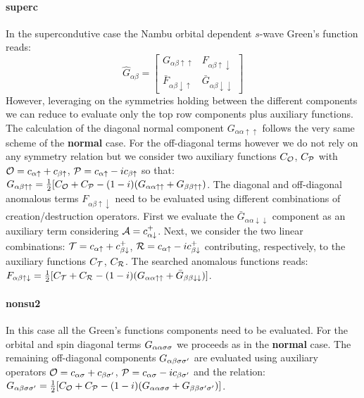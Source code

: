 \documentclass[final,3p,10pt]{elsarticle}
\def\a{\alpha}       \def\b{\beta}   \def\g{\gamma}   \def\d{\delta}
\def\PP{{\cal P}}\def\EE{{\cal E}}\def\MM{{\cal M}} \def\VV{{\cal V}}
\def\TT{{\cal T}}\def\NN{{\cal N}}\def\BB{{\cal B}} \def\II{{\cal I}}
\def\RR{{\cal R}}\def\LL{{\cal L}}\def\JJ{{\cal J}} \def\OO{{\cal O}}
\def\AA{{\cal A}}
\def\up{\uparrow} \def\down{\downarrow} \def\dw{\downarrow}
\begin{document}
\paragraph{{\bf superc}}
In the supercondutive case the Nambu orbital
dependent $s$-wave Green's function reads:
\begin{equation}
  \label{GFnambu}
  \hat{G}_{\a\b} =
  \begin{bmatrix}
    G_{\a\b\up\up} & F_{\a\b\up\dw} \\
    \bar{F}_{\a\b\dw\up} & \bar{G}_{\a\b\dw\dw}
  \end{bmatrix}  
\end{equation}
However, leveraging on the symmetries holding between the different
components we can reduce to evaluate only the top row components plus
auxiliary functions.
The calculation of the diagonal normal component $G_{\a\a\up\up}$ follows the
very same scheme of the {\bf normal} case. For the off-diagonal terms
however we do not rely on any symmetry relation but we consider 
two auxiliary functions $C_\OO$, $C_\PP$ with $\OO=c_{\a\up} +
c_{\b\up}$, $\PP=c_{\a\up} -ic_{\b\up}$ so that:
$G_{\a\b\up\up}=\tfrac{1}{2}[C_\OO + C_\PP -
(1-i)(G_{\a\a\up\up}+G_{\b\b\up\up})$.
The diagonal and off-diagonal anomalous terms $F_{\a\b\up\dw}$ need to
be evaluated using different combinations of creation/destruction
operators. First we evaluate the $\bar{G}_{\a\a\dw\dw}$ component as
an auxiliary term considering $\AA=c^+_{\a\dw}$. 
Next, we consider the two linear combinations:
$\TT = c_{\a\up} + c^+_{\b\dw}$, $\RR=c_{\a\up} -i c^+_{\b\dw}$
contributing, respectively, to the auxiliary functions $C_\TT$,
$C_\RR$. The searched anomalous functions reads:
$F_{\a\b\up\dw} = \tfrac{1}{2}[ C_\TT + C_\RR - (1-i)(G_{\a\a\up\up} +
\bar{G}_{\b\b\dw\dw})]$. 


\paragraph{{\bf nonsu2}}
In this case all the Green's functions components need
to be evaluated. For the orbital and spin diagonal terms
$G_{\a\a\s\s}$  we proceeds as in the {\bf normal} case.
The remaining  off-diagonal components $G_{\a\b\s\s'}$ are
evaluated using auxiliary operators $\OO=c_{\a\s}+c_{\b\s'}$,
$\PP=c_{\a\s}-ic_{\b\s'}$ and the relation:
$G_{\a\b\s\s'}=\tfrac{1}{2}[C_\OO+C_\PP -
(1-i)(G_{\a\a\s\s}+G_{\b\b\s'\s'})]$.
\end{document}
